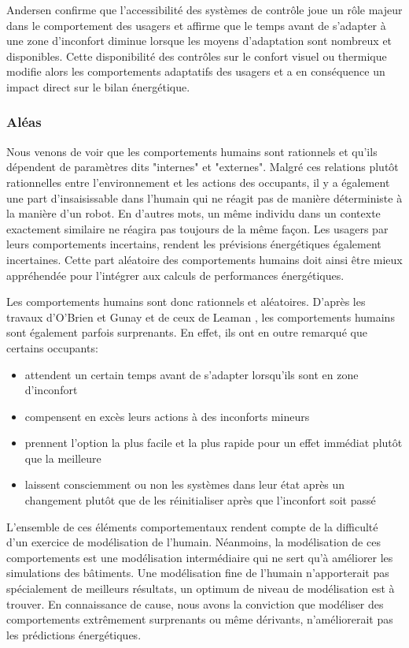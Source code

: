 Andersen \cite{Andersen-09} confirme que l'accessibilité des systèmes de contrôle joue un rôle majeur dans le comportement des usagers et affirme que le temps avant de s'adapter à une zone d'inconfort diminue lorsque les moyens d'adaptation sont nombreux et disponibles. Cette disponibilité des contrôles sur le confort visuel ou thermique modifie alors les comportements adaptatifs des usagers et a en conséquence un impact direct sur le bilan énergétique.

\subsubsection{Aléas}

Nous venons de voir que les comportements humains sont rationnels et qu'ils dépendent de paramètres dits "internes" et "externes". Malgré ces relations plutôt rationnelles entre l'environnement et les actions des occupants, il y a également une part d'insaisissable dans l'humain qui ne réagit pas de manière déterministe à la manière d'un robot. En d'autres mots, un même individu dans un contexte exactement similaire ne réagira pas toujours de la même façon. Les usagers par leurs comportements incertains, rendent les prévisions énergétiques également incertaines. Cette part aléatoire des comportements humains doit ainsi être mieux appréhendée pour l'intégrer aux calculs de performances énergétiques.

Les comportements humains sont donc rationnels et aléatoires. D'après les travaux d'O'Brien et Gunay \cite{O'Brien-14} et de ceux de Leaman \cite{Leaman-99}, les comportements humains sont également parfois surprenants. En effet, ils ont en outre remarqué que certains occupants:
\begin{itemize}
 \item attendent un certain temps avant de s'adapter lorsqu'ils sont en zone d'inconfort
 \item compensent en excès leurs actions à des inconforts mineurs
 \item prennent l'option la plus facile et la plus rapide pour un effet immédiat plutôt que la meilleure 
 \item laissent consciemment ou non les systèmes dans leur état après un changement plutôt que de les réinitialiser après que l'inconfort soit passé
 \end{itemize} 

L'ensemble de ces éléments comportementaux rendent compte de la difficulté d'un exercice de modélisation de l'humain. Néanmoins, la modélisation de ces comportements est une modélisation intermédiaire qui ne sert qu'à améliorer les simulations des bâtiments. Une modélisation fine de l'humain n'apporterait pas spécialement de meilleurs résultats, un optimum de niveau de modélisation est à trouver. En connaissance de cause, nous avons la conviction que modéliser des comportements extrêmement surprenants ou même dérivants, n'améliorerait pas les prédictions énergétiques.

